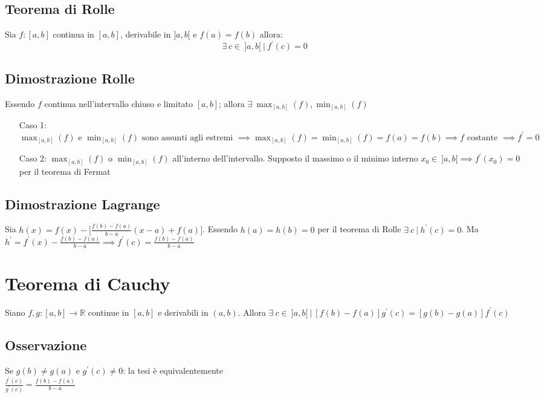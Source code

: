 \subsection{Teorema di Rolle}
Sia $f: [a,b]$ continua in $[a,b]$, derivabile in $]a,b[$ e $f(a) = f(b)$ allora:
\begin{equation}
\exists\ c \in\ ]a,b[\ |\ f^{\prime}(c) = 0
\end{equation}
\subsection{Dimostrazione Rolle}
Essendo $f$ continua nell'intervallo chiuso e limitato $[a,b]$; allora $\exists\ \displaystyle \max_{[a,b]}(f), \min_{[a,b]}(f)$
\begin{enumerate}
\item[Caso 1:] $\displaystyle \max_{[a,b]}(f) \text{ e } \min_{[a,b]}(f) \text{ sono assunti agli estremi } \implies \max_{[a,b]}(f) = \min_{[a,b]}(f) = f(a) = f(b) \implies f \text{ costante } \implies f^{\prime} = 0$
\item[Caso 2:] $\displaystyle \max_{[a,b]}(f) \text{ o } \min_{[a,b]}(f)$ all'interno dell'intervallo. Supposto il massimo o il minimo interno $x_0 \in\ ]a,b[ \implies f^{\prime}(x_0) = 0$ per il teorema di Fermat
\end{enumerate}
\subsection{Dimostrazione Lagrange}
Sia $h(x) = f(x) - \biggl [\frac{f(b) - f(a)}{b - a}(x-a) + f(a) \biggl ]$. Essendo $h(a) = h(b) = 0$ per il teorema di Rolle $\exists\ c\ |\ h^{\prime}(c) = 0$. Ma $h^{\prime} = f^{\prime}(x) - \frac{f(b) - f(a)}{b - a} \implies f^{\prime}(c) = \frac{f(b) - f(a)}{b - a}$

\section{Teorema di Cauchy}
Siano $f,g: [a,b] \to \mathbb{R}$ continue in $[a,b]$ e derivabili in $(a,b)$. Allora $\exists\ c \in\ ]a,b[\ |\ [f(b) - f(a)]g^{\prime}(c) = [g(b) - g(a)]f^{\prime}(c) $
\subsection{Osservazione}
Se $g(b) \neq g(a)$ e $g^{\prime}(c) \neq 0$: la tesi è equivalentemente\\
$\frac{f^{\prime}(c)}{g^{\prime}(c)} = \frac{f(b) - f(a)}{b - a}$

